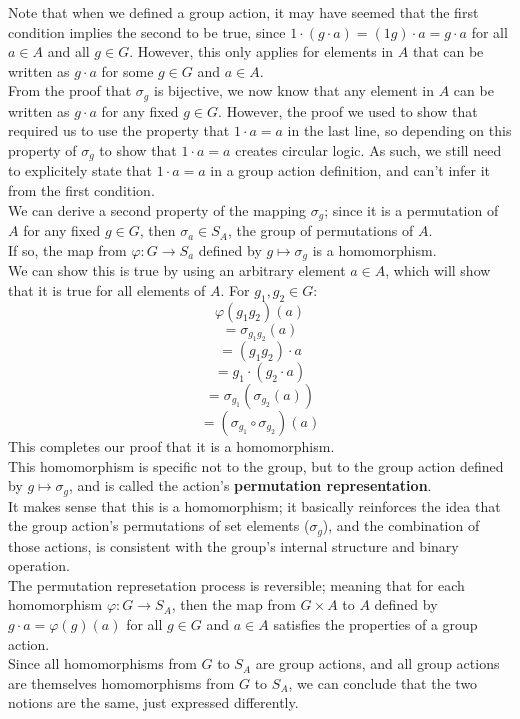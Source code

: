 \documentclass[12pt]{article}
\begin{document}
    Note that when we defined a group action,
    it may have seemed that the first condition
    implies the second to be true,
    since $1 \cdot (g \cdot a) = (1g) \cdot a = g \cdot a$
    for all $a \in A$ and all $g \in G$.
    However, this only applies for elements in $A$
    that can be written as $g \cdot a$
    for some $g \in G$ and $a \in A$. \\
    From the proof that $\sigma_g$ is bijective,
    we now know that any element in $A$ can be written as $g \cdot a$
    for any fixed $g \in G$.
    However, the proof we used to show that required
    us to use the property that $1 \cdot a = a$
    in the last line,
    so depending on this property of $\sigma_g$
    to show that $1 \cdot a = a$ creates circular logic.
    As such, we still need to explicitely state that
    $1 \cdot a = a$ in a group action definition,
    and can't infer it from the first condition. \\

    We can derive a second property of the mapping $\sigma_g$;
    since it is a permutation of $A$
    for any fixed $g \in G$,
    then $\sigma_a \in S_A$, the group of permutations of $A$. \\
    If so, the map from $\varphi: G \to S_a$
    defined by $g \mapsto \sigma_g$
    is a homomorphism. \\
    We can show this is true by using an arbitrary element
    $a \in A$,
    which will show that it is true for all elements of $A$.
    For $g_1, g_2 \in G$:
    \[ \varphi(g_1g_2)(a) \]
    \[ = \sigma_{g_1g_2}(a) \]
    \[ = (g_1g_2) \cdot a \]
    \[ = g_1 \cdot (g_2 \cdot a) \]
    \[ = \sigma_{g_1}(\sigma_{g_2}(a)) \]
    \[ = (\sigma_{g_1} \circ \sigma_{g_2})(a) \]
    This completes our proof that it is a homomorphism. \\
    This homomorphism is specific not to the group,
    but to the group action defined by $g \mapsto \sigma_g$,
    and is called the action's \textbf{permutation representation}. \\
    It makes sense that this is a homomorphism;
    it basically reinforces the idea that the group action's
    permutations of set elements ($\sigma_g$),
    and the combination of those actions,
    is consistent with the group's internal structure
    and binary operation. \\

    The permutation represetation process is reversible;
    meaning that for each homomorphism $\varphi: G \to S_A$,
    then the map from $G \times A$ to $A$ defined by
    $g \cdot a = \varphi(g)(a)$ for all $g \in G$ and $a \in A$
    satisfies the properties of a group action. \\
    Since all homomorphisms from $G$ to $S_A$ are group actions,
    and all group actions are themselves homomorphisms from $G$ to $S_A$,
    we can conclude that the two notions are the same,
    just expressed differently. \\
\end{document}
